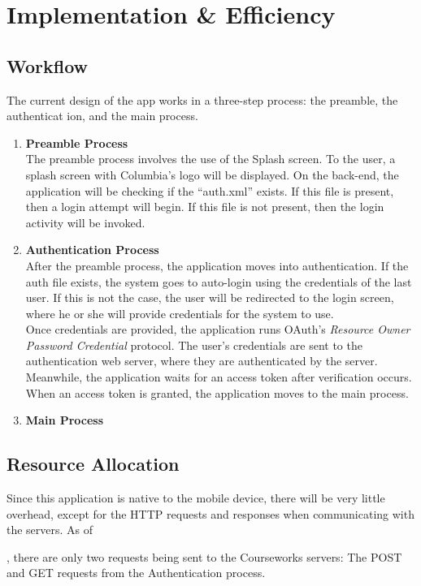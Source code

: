 \documentclass{article}
\begin{document}
\section{Implementation \& Efficiency}

\subsection{Workflow}
The current design of the app works in a three-step process: the preamble, the authenticat
ion, and the main process.
\begin{enumerate}
    \item \textbf{Preamble Process} \\ 
The preamble process involves the use of the Splash screen. To the user, a splash screen 
with Columbia's logo will be displayed. On the back-end, the application will be checking 
if the ``auth.xml'' exists. If this file is present, then a login attempt will begin. If 
this file is not present, then the login activity will be invoked.
    \item \textbf{Authentication Process} \\ 
        After the preamble process, the application moves into authentication. If the auth
        file exists, the system goes to auto-login using the credentials of the last user.
        If this is not the case, the user will be redirected to the login screen, where he
        or she will provide credentials for the system to use. \\ Once credentials are 
        provided, the application runs OAuth's \emph{Resource Owner Password Credential} 
        protocol. The user's credentials are sent to the authentication web server, where 
        they are authenticated by the server. Meanwhile, the application
        waits for an access token after verification occurs. When an access token is 
        granted, the application moves to the main process.
    \item \textbf{Main Process} 
\end{enumerate}

\subsection{Resource Allocation}
Since this application is native to the mobile device, there will be very little 
overhead, except for the HTTP requests and responses when communicating with the 
servers. As of \date{\today}, there are only two requests being sent to the Courseworks servers: The POST and GET requests from the Authentication process.
\end{document}
